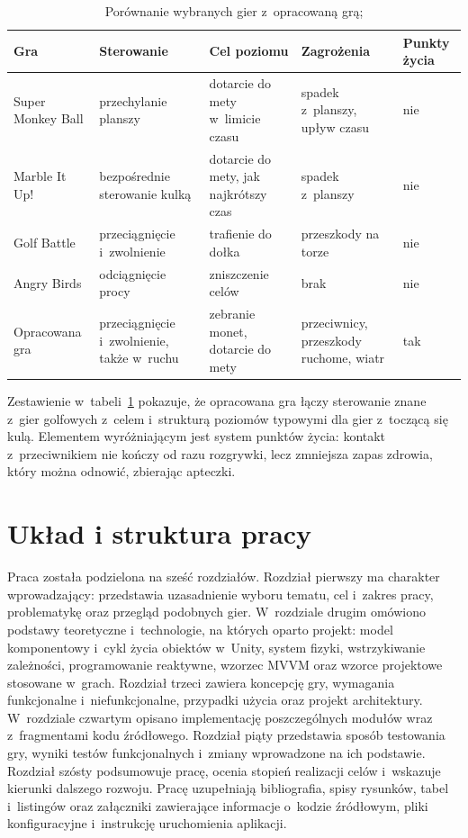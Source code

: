 \begin{table}[!htb]
  \centering
  \caption{Porównanie wybranych gier z~opracowaną grą; \zrodloWlasne}
  \label{tab:porownanie-gier}
  \begin{tabularx}{\textwidth}{>{\raggedright\arraybackslash}p{2.35cm}
      >{\raggedright\arraybackslash}X >{\raggedright\arraybackslash}X
      >{\raggedright\arraybackslash}X >{\centering\arraybackslash}p{1.45cm}}
    \toprule
    \textbf{Gra} & \textbf{Sterowanie} & \textbf{Cel poziomu} & \textbf{Zagrożenia} & \textbf{Punkty życia} \\
    \midrule
    Super Monkey Ball & przechylanie planszy & dotarcie do mety w~limicie czasu & spadek z~planszy, upływ czasu & nie \\
    Marble It Up! & bezpośrednie sterowanie kulką & dotarcie do mety, jak najkrótszy czas & spadek z~planszy & nie \\
    Golf Battle & przeciągnięcie i~zwolnienie & trafienie do dołka & przeszkody na torze & nie \\
    Angry Birds & odciągnięcie procy & zniszczenie celów & brak & nie \\
    \midrule
    Opracowana gra & przeciągnięcie i~zwolnienie, także w~ruchu & zebranie monet, dotarcie do mety & przeciwnicy, przeszkody ruchome, wiatr & tak \\
    \bottomrule
  \end{tabularx}
\end{table}

Zestawienie w~tabeli~\ref{tab:porownanie-gier} pokazuje, że opracowana gra łączy sterowanie
znane z~gier golfowych z~celem i~strukturą poziomów typowymi dla gier z~toczącą się kulą.
Elementem wyróżniającym jest system punktów życia: kontakt z~przeciwnikiem nie kończy od
razu rozgrywki, lecz zmniejsza zapas zdrowia, który można odnowić, zbierając apteczki.

\section{Układ i struktura pracy}

Praca została podzielona na sześć rozdziałów. Rozdział pierwszy ma charakter wprowadzający:
przedstawia uzasadnienie wyboru tematu, cel i~zakres pracy, problematykę oraz przegląd
podobnych gier. W~rozdziale drugim omówiono podstawy teoretyczne i~technologie, na których
oparto projekt: model komponentowy i~cykl życia obiektów w~Unity, system fizyki,
wstrzykiwanie zależności, programowanie reaktywne, wzorzec MVVM oraz wzorce projektowe
stosowane w~grach. Rozdział trzeci zawiera koncepcję gry, wymagania funkcjonalne
i~niefunkcjonalne, przypadki użycia oraz projekt architektury. W~rozdziale czwartym opisano
implementację poszczególnych modułów wraz z~fragmentami kodu źródłowego. Rozdział piąty
przedstawia sposób testowania gry, wyniki testów funkcjonalnych i~zmiany wprowadzone na ich
podstawie. Rozdział szósty podsumowuje pracę, ocenia stopień realizacji celów i~wskazuje
kierunki dalszego rozwoju. Pracę uzupełniają bibliografia, spisy rysunków, tabel i~listingów
oraz załączniki zawierające informacje o~kodzie źródłowym, pliki konfiguracyjne
i~instrukcję uruchomienia aplikacji.
